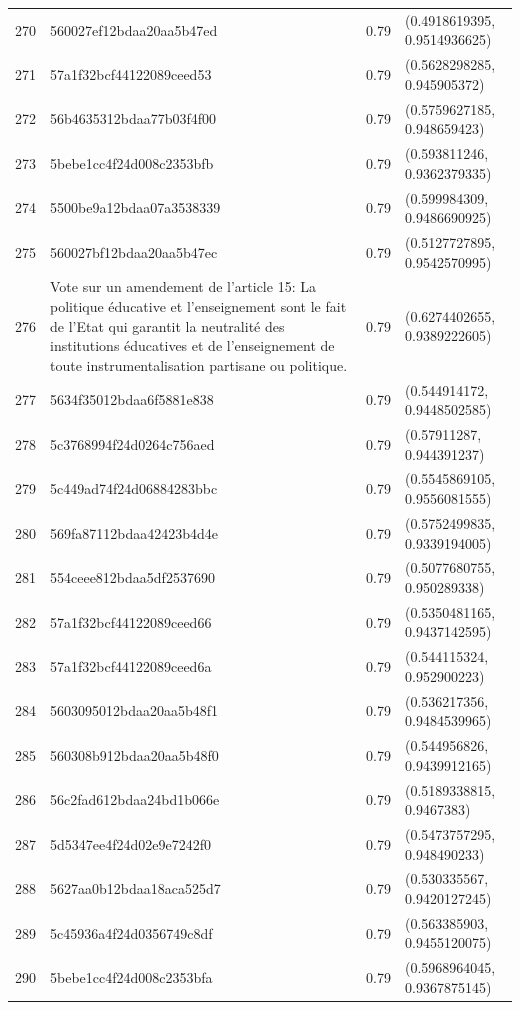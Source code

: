 \begin{table}[ht]
\begin{tabular}{rlrl}
  270 & 560027ef12bdaa20aa5b47ed & 0.79 & (0.4918619395, 0.9514936625) \\ 
  271 & 57a1f32bcf44122089ceed53 & 0.79 & (0.5628298285, 0.945905372) \\ 
  272 & 56b4635312bdaa77b03f4f00 & 0.79 & (0.5759627185, 0.948659423) \\ 
  273 & 5bebe1cc4f24d008c2353bfb & 0.79 & (0.593811246, 0.9362379335) \\ 
  274 & 5500be9a12bdaa07a3538339 & 0.79 & (0.599984309, 0.9486690925) \\ 
  275 & 560027bf12bdaa20aa5b47ec & 0.79 & (0.5127727895, 0.9542570995) \\ 
  276 & Vote sur un amendement de l'article 15: La politique éducative et l’enseignement sont le fait de l’Etat qui garantit la neutralité des institutions éducatives et de l’enseignement de toute instrumentalisation partisane ou politique. & 0.79 & (0.6274402655, 0.9389222605) \\ 
  277 & 5634f35012bdaa6f5881e838 & 0.79 & (0.544914172, 0.9448502585) \\ 
  278 & 5c3768994f24d0264c756aed & 0.79 & (0.57911287, 0.944391237) \\ 
  279 & 5c449ad74f24d06884283bbc & 0.79 & (0.5545869105, 0.9556081555) \\ 
  280 & 569fa87112bdaa42423b4d4e & 0.79 & (0.5752499835, 0.9339194005) \\ 
  281 & 554ceee812bdaa5df2537690 & 0.79 & (0.5077680755, 0.950289338) \\ 
  282 & 57a1f32bcf44122089ceed66 & 0.79 & (0.5350481165, 0.9437142595) \\ 
  283 & 57a1f32bcf44122089ceed6a & 0.79 & (0.544115324, 0.952900223) \\ 
  284 & 5603095012bdaa20aa5b48f1 & 0.79 & (0.536217356, 0.9484539965) \\ 
  285 & 560308b912bdaa20aa5b48f0 & 0.79 & (0.544956826, 0.9439912165) \\ 
  286 & 56c2fad612bdaa24bd1b066e & 0.79 & (0.5189338815, 0.9467383) \\ 
  287 & 5d5347ee4f24d02e9e7242f0 & 0.79 & (0.5473757295, 0.948490233) \\ 
  288 & 5627aa0b12bdaa18aca525d7 & 0.79 & (0.530335567, 0.9420127245) \\ 
  289 & 5c45936a4f24d0356749c8df & 0.79 & (0.563385903, 0.9455120075) \\ 
  290 & 5bebe1cc4f24d008c2353bfa & 0.79 & (0.5968964045, 0.9367875145) \\ 

\end{tabular}
\end{table}
